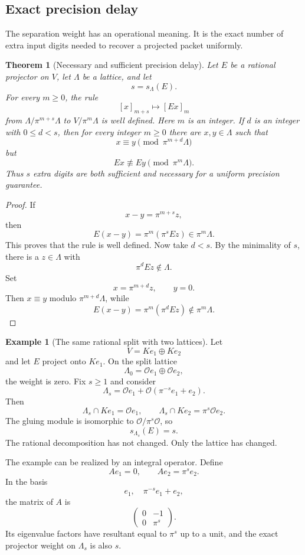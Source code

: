 \documentclass[11pt,a4paper]{article}
\newtheorem{theorem}{Theorem}[section]
\theoremstyle{definition}
\newtheorem{example}[example]{Example}
\theoremstyle{remark}
\newcommand{\OO}{\mathcal O}
\providecommand{\OO}{\mathcal O}
\theoremstyle{definition}\newtheorem{construction}[theorem]{Construction}\newtheorem{certificate}[theorem]{Numerical Certificate}
\theoremstyle{remark}\newtheorem{boundary}[theorem]{Boundary}
\begin{document}
\subsection{Exact precision delay}

The separation weight has an operational meaning.  It is the exact number of extra input digits needed to recover a projected packet uniformly.

\begin{theorem}[Necessary and sufficient precision delay]\label{thm:precision_delay}
Let $E$ be a rational projector on $V$, let $\Lambda$ be a lattice, and let
\[
s=s_\Lambda(E).
\]
For every $m\geq0$, the rule
\[
[x]_{m+s}\longmapsto[Ex]_m
\]
from $\Lambda/\pi^{m+s}\Lambda$ to $V/\pi^m\Lambda$ is well defined.  Here $m$ is an integer.  If $d$ is an integer with $0\leq d<s$, then for every integer $m\geq0$ there are $x,y\in\Lambda$ such that
\[
x\equiv y\pmod{\pi^{m+d}\Lambda}
\]
but
\[
Ex\not\equiv Ey\pmod{\pi^m\Lambda}.
\]
Thus $s$ extra digits are both sufficient and necessary for a uniform precision guarantee.
\end{theorem}

\begin{proof}
If
\[
x-y=\pi^{m+s}z,
\]
then
\[
E(x-y)=\pi^m(\pi^sEz)\in\pi^m\Lambda.
\]
This proves that the rule is well defined.  Now take $d<s$.  By the minimality of $s$, there is a $z\in\Lambda$ with
\[
\pi^dEz\notin\Lambda.
\]
Set
\[
x=\pi^{m+d}z,
\qquad
y=0.
\]
Then $x\equiv y$ modulo $\pi^{m+d}\Lambda$, while
\[
E(x-y)=\pi^m(\pi^dEz)\notin\pi^m\Lambda.
\]
\end{proof}

\begin{example}[The same rational split with two lattices]\label{ex:lattice_dependence}
Let
\[
V=Ke_1\oplus Ke_2
\]
and let $E$ project onto $Ke_1$.  On the split lattice
\[
\Lambda_0=\OO e_1\oplus\OO e_2,
\]
the weight is zero.  Fix $s\geq1$ and consider
\[
\Lambda_s
=
\OO e_1+
\OO(\pi^{-s}e_1+e_2).
\]
Then
\[
\Lambda_s\cap Ke_1=\OO e_1,
\qquad
\Lambda_s\cap Ke_2=\pi^s\OO e_2.
\]
The gluing module is isomorphic to $\OO/\pi^s\OO$, so
\[
s_{\Lambda_s}(E)=s.
\]
The rational decomposition has not changed.  Only the lattice has changed.
\end{example}

The example can be realized by an integral operator.  Define
\[
Ae_1=0,
\qquad
Ae_2=\pi^se_2.
\]
In the basis
\[
e_1,
\quad
\pi^{-s}e_1+e_2,
\]
the matrix of $A$ is
\[
\begin{pmatrix}
0&-1\\
0&\pi^s
\end{pmatrix}.
\]
Its eigenvalue factors have resultant equal to $\pi^s$ up to a unit, and the exact projector weight on $\Lambda_s$ is also $s$.
\end{document}
